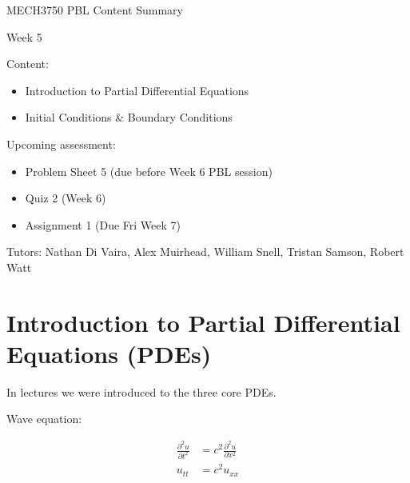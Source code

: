 \documentclass[12pt]{article}
\begin{document}
\begin{center}
{\Huge   MECH3750 PBL Content Summary}

\vspace{6mm}

{\Huge  Week 5}

\end{center}

\vspace{6mm}

{\Large Content:}
{\begin{itemize}
	\item Introduction to Partial Differential Equations
	\item Initial Conditions \& Boundary Conditions 
\end{itemize}}

\vspace{4mm}

{\Large Upcoming assessment:}
{\begin{itemize}
	\item Problem Sheet 5 (due before Week 6 PBL session)
	\item Quiz 2 (Week 6)
	\item Assignment 1 (Due Fri Week 7)
\end{itemize}}

\vspace{4mm}

{Tutors: Nathan Di Vaira, Alex Muirhead, William Snell, Tristan Samson, Robert Watt}


\pagebreak


\section{Introduction to Partial Differential Equations (PDEs)}

\vspace{4mm}

In lectures we were introduced to the three core PDEs.

\vspace{4mm}

\hspace{8mm} Wave equation:

\begin{align*}
\frac{\partial^2u}{\partial t^2} &= c^2 \frac{\partial^2u}{\partial x^2}  \\[0.8em]
u_{tt} &= c^2u_{xx}
\end{align*}
\end{document}
